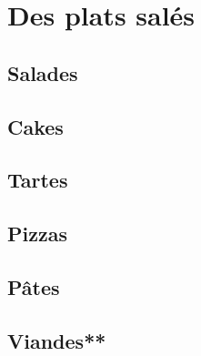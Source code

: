 \documentclass[A4paper,twoside, 12pt]{book}
\begin{document}
\frontmatter
\tableofcontents 		%

\mainmatter


\part{Des plats salés}
	\chapter{Salades}





	\chapter{Cakes}




	
	
	\chapter{Tartes}


	



	\chapter{Pizzas}
	\chapter{Pâtes}
	
	\chapter{Viandes**}









\end{document}
